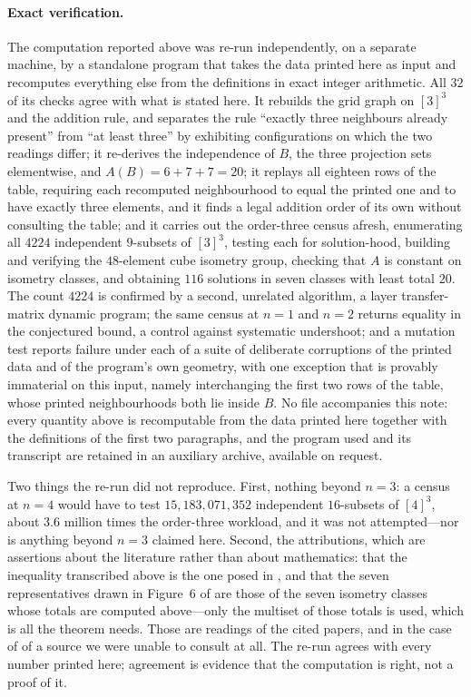 \documentclass[11pt]{amsart}
\begin{document}
\paragraph{Exact verification.}
The computation reported above was re-run independently, on a separate
machine, by a standalone program that takes the data printed here as input
and recomputes everything else from the definitions in exact integer
arithmetic. All $32$ of its checks agree with what is stated here. It
rebuilds the grid graph on $[3]^3$ and the addition rule, and separates the
rule ``exactly three neighbours already present'' from ``at least three'' by
exhibiting configurations on which the two readings differ; it re-derives
the independence of $B$, the three projection sets elementwise, and
$A(B)=6+7+7=20$; it replays all eighteen rows of the table, requiring each
recomputed neighbourhood to equal the printed one and to have exactly three
elements, and it finds a legal addition order of its own without consulting
the table; and it carries out the order-three census afresh, enumerating all
$4224$ independent $9$-subsets of $[3]^3$, testing each for solution-hood,
building and verifying the $48$-element cube isometry group, checking that
$A$ is constant on isometry classes, and obtaining $116$ solutions in seven
classes with least total $20$. The count $4224$ is confirmed by a second,
unrelated algorithm, a layer transfer-matrix dynamic program; the same
census at $n=1$ and $n=2$ returns equality in the conjectured bound, a
control against systematic undershoot; and a mutation test reports failure
under each of a suite of deliberate corruptions of the printed data and of
the program's own geometry, with one exception that is provably immaterial
on this input, namely interchanging the first two rows of the table, whose
printed neighbourhoods both lie inside $B$. No file accompanies this note:
every quantity above is recomputable from the data printed here together
with the definitions of the first two paragraphs, and the program used and
its transcript are retained in an auxiliary archive, available on request.

Two things the re-run did not reproduce. First, nothing beyond $n=3$: a
census at $n=4$ would have to test $15{,}183{,}071{,}352$ independent
$16$-subsets of $[4]^3$, about $3.6$ million times the order-three workload,
and it was not attempted---nor is anything beyond $n=3$ claimed here.
Second, the attributions, which are assertions about the literature rather
than about mathematics: that the inequality transcribed above is the one
posed in \cite{BKV}, and that the seven representatives drawn in Figure~6 of
\cite{BW} are those of the seven isometry classes whose totals are computed
above---only the multiset of those totals is used, which is all the theorem
needs. Those are readings of the cited papers, and in the case of \cite{BKV}
of a source we were unable to consult at all. The re-run agrees with every
number printed here; agreement is evidence that the computation is right,
not a proof of it.
\end{document}
